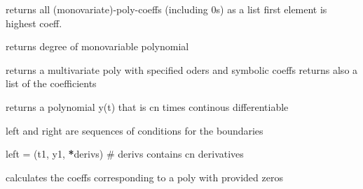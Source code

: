 \documentclass[letterpaper,10pt,english]{sphinxmanual}
\begin{document}
\begin{fulllineitems}
\label{pycontroltools:auxfuncs.math.polynomial.poly_coeffs}
returns all (monovariate)-poly-coeffs (including 0s) as a list
first element is highest coeff.

\end{fulllineitems}


\begin{fulllineitems}
\label{pycontroltools:auxfuncs.math.polynomial.poly_degree}
returns degree of monovariable polynomial

\end{fulllineitems}


\begin{fulllineitems}
\label{pycontroltools:auxfuncs.math.polynomial.poly_scalar_field}
returns a multivariate poly with specified oders
and symbolic coeffs
returns also a list of the coefficients

\end{fulllineitems}


\begin{fulllineitems}
\label{pycontroltools:auxfuncs.math.polynomial.trans_poly}
returns a polynomial y(t) that is cn times continous differentiable

left and right are sequences of conditions for the boundaries

left = (t1, y1,  {\color{red}\bfseries{}*}derivs) \# derivs contains cn derivatives

\end{fulllineitems}


\begin{fulllineitems}
\label{pycontroltools:auxfuncs.math.polynomial.zeros_to_coeffs}
calculates the coeffs corresponding to a poly with provided zeros

\end{fulllineitems}
\end{document}
